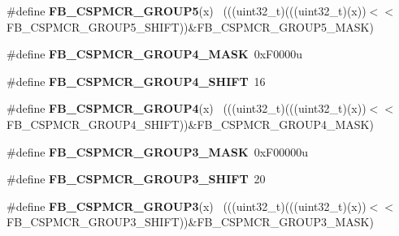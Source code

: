 \begin{DoxyCompactItemize}
\item 
\hypertarget{group___f_b___register___masks_ga63e0efd92a457661052bdbbc62f800af}{}\#define {\bfseries F\+B\+\_\+\+C\+S\+P\+M\+C\+R\+\_\+\+G\+R\+O\+U\+P5}(x)                                        ~(((uint32\+\_\+t)(((uint32\+\_\+t)(x))$<$$<$F\+B\+\_\+\+C\+S\+P\+M\+C\+R\+\_\+\+G\+R\+O\+U\+P5\+\_\+\+S\+H\+I\+F\+T))\&F\+B\+\_\+\+C\+S\+P\+M\+C\+R\+\_\+\+G\+R\+O\+U\+P5\+\_\+\+M\+A\+S\+K)\label{group___f_b___register___masks_ga63e0efd92a457661052bdbbc62f800af}

\item 
\hypertarget{group___f_b___register___masks_gaa24d34ff345a0131f93f71c38e20b7a5}{}\#define {\bfseries F\+B\+\_\+\+C\+S\+P\+M\+C\+R\+\_\+\+G\+R\+O\+U\+P4\+\_\+\+M\+A\+S\+K}~0x\+F0000u\label{group___f_b___register___masks_gaa24d34ff345a0131f93f71c38e20b7a5}

\item 
\hypertarget{group___f_b___register___masks_ga53fde1abc71ae9149418ea7fb6e53fba}{}\#define {\bfseries F\+B\+\_\+\+C\+S\+P\+M\+C\+R\+\_\+\+G\+R\+O\+U\+P4\+\_\+\+S\+H\+I\+F\+T}~16\label{group___f_b___register___masks_ga53fde1abc71ae9149418ea7fb6e53fba}

\item 
\hypertarget{group___f_b___register___masks_gab06572d35c1e04d27ba4eaebe576ac07}{}\#define {\bfseries F\+B\+\_\+\+C\+S\+P\+M\+C\+R\+\_\+\+G\+R\+O\+U\+P4}(x)                                        ~(((uint32\+\_\+t)(((uint32\+\_\+t)(x))$<$$<$F\+B\+\_\+\+C\+S\+P\+M\+C\+R\+\_\+\+G\+R\+O\+U\+P4\+\_\+\+S\+H\+I\+F\+T))\&F\+B\+\_\+\+C\+S\+P\+M\+C\+R\+\_\+\+G\+R\+O\+U\+P4\+\_\+\+M\+A\+S\+K)\label{group___f_b___register___masks_gab06572d35c1e04d27ba4eaebe576ac07}

\item 
\hypertarget{group___f_b___register___masks_gac53d0fcbc3464725ceda1d20147fe98c}{}\#define {\bfseries F\+B\+\_\+\+C\+S\+P\+M\+C\+R\+\_\+\+G\+R\+O\+U\+P3\+\_\+\+M\+A\+S\+K}~0x\+F00000u\label{group___f_b___register___masks_gac53d0fcbc3464725ceda1d20147fe98c}

\item 
\hypertarget{group___f_b___register___masks_ga9f0b849b6cb1a2f629dcd23a0a0a4306}{}\#define {\bfseries F\+B\+\_\+\+C\+S\+P\+M\+C\+R\+\_\+\+G\+R\+O\+U\+P3\+\_\+\+S\+H\+I\+F\+T}~20\label{group___f_b___register___masks_ga9f0b849b6cb1a2f629dcd23a0a0a4306}

\item 
\hypertarget{group___f_b___register___masks_gadf0a03bd6ac07968aaa35ad4f6fecfeb}{}\#define {\bfseries F\+B\+\_\+\+C\+S\+P\+M\+C\+R\+\_\+\+G\+R\+O\+U\+P3}(x)                                        ~(((uint32\+\_\+t)(((uint32\+\_\+t)(x))$<$$<$F\+B\+\_\+\+C\+S\+P\+M\+C\+R\+\_\+\+G\+R\+O\+U\+P3\+\_\+\+S\+H\+I\+F\+T))\&F\+B\+\_\+\+C\+S\+P\+M\+C\+R\+\_\+\+G\+R\+O\+U\+P3\+\_\+\+M\+A\+S\+K)\label{group___f_b___register___masks_gadf0a03bd6ac07968aaa35ad4f6fecfeb}


\end{DoxyCompactItemize}
